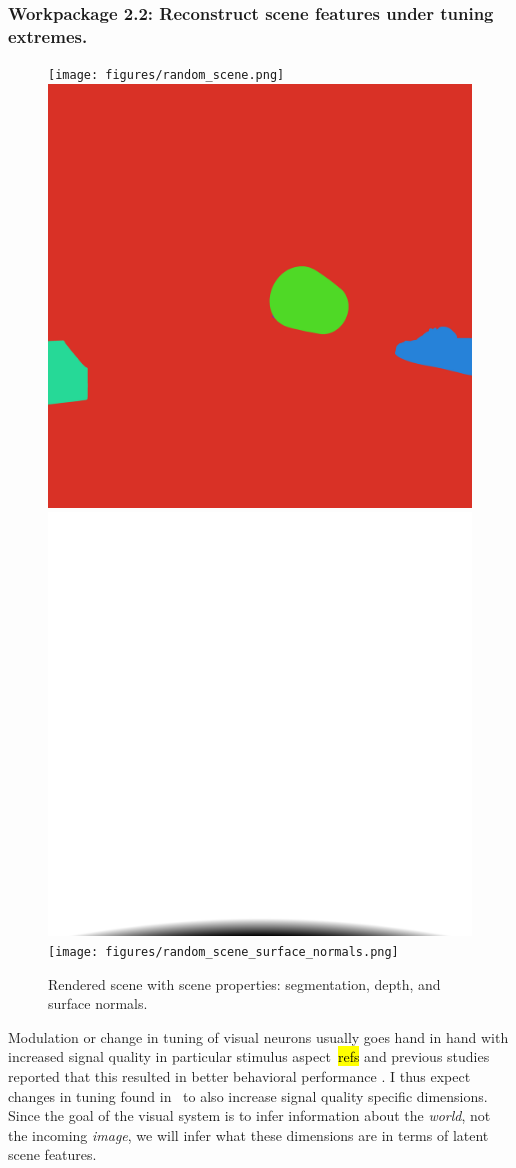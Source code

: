 \documentclass[B2,COG]{ercgrant}
\begin{document}
\subsubsection{Workpackage 2.2: Reconstruct scene features under tuning extremes. \hfill {}}
\begin{figure}
\texttt{[image: figures/random\_scene.png]}
\includegraphics[height=.24\linewidth]{figures/random_scene_segmentation.png}
\includegraphics[height=.24\linewidth]{figures/random_scene_depth.png}
\texttt{[image: figures/random\_scene\_surface\_normals.png]}
\caption{Rendered scene with scene properties: segmentation, depth, and surface normals.\label{fig:o2wp2}}
\end{figure}
Modulation or change in tuning of visual neurons usually goes hand in hand with increased signal quality in particular stimulus aspect~\hl{refs} and previous studies reported that this resulted in better behavioral performance \parencite{Spitzer1988-kq, Bennett2013-rk, Dadarlat2017-jw, De_Gee2022-ir}.
I thus expect changes in tuning found in~ to also increase signal quality specific dimensions.
Since the goal of the visual system is to infer information about the \textit{world}, not the incoming \textit{image}, we will infer what these dimensions are in terms of latent scene features. 
\end{document}
